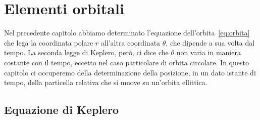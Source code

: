 \chapter{Elementi orbitali}
\label{chap:elementi-orbitali}

Nel precedente capitolo abbiamo determinato l'equazione
dell'orbita~\eqref{eq:orbita} che lega la coordinata polare $r$ all'altra
coordinata $\theta$, che dipende a sua volta dal tempo. La seconda legge di
Keplero, però, ci dice che $\theta$ non varia in maniera costante con il tempo,
eccetto nel caso particolare di orbita circolare. In questo capitolo ci
occuperemo della determinazione della posizione, in un dato istante di tempo,
della particella relativa che si muove su un'orbita ellittica.

\section{Equazione di Keplero}
\label{sec:equazione-keplero}


